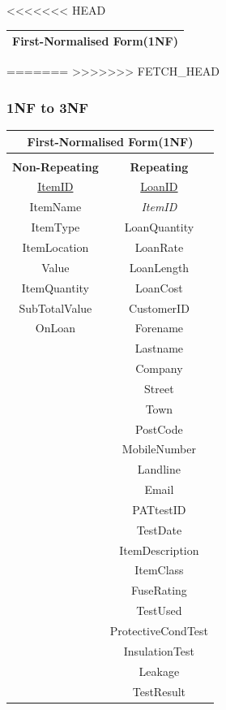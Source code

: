 \newpage

<<<<<<< HEAD
\begin{center}
    \begin{tabular}{|p{4cm}|}
        \hline
        \textbf{First-Normalised Form(1NF)}\\ \hline

    \end{tabular}
\end{center}


=======
>>>>>>> FETCH_HEAD
\subsubsection{1NF to 3NF}

\begin{center}
    \begin{tabular}{|c|c|}
        \hline
        \multicolumn{2}{|c|}{\textbf{First-Normalised Form(1NF)}}\\ \hline
        \multicolumn{2}{|c|}{ }\\ \hline
        \textbf{Non-Repeating} & \textbf{Repeating}\\ \hline
        \underline{ItemID }& \underline{LoanID }\\ \hline
        ItemName & \emph{ItemID} \\ \hline
        ItemType & LoanQuantity \\ \hline
        ItemLocation & LoanRate\\ \hline
        Value & LoanLength \\ \hline
        ItemQuantity & LoanCost \\ \hline
        SubTotalValue & CustomerID \\ \hline
        OnLoan &  Forename \\ \hline
         & Lastname \\ \hline
         & Company \\ \hline
         & Street \\ \hline
         & Town \\ \hline
         & PostCode \\ \hline
         & MobileNumber \\ \hline
         & Landline \\ \hline
         & Email \\ \hline
         & PATtestID \\ \hline
         & TestDate \\ \hline
         & ItemDescription \\ \hline
         & ItemClass \\ \hline
         & FuseRating \\ \hline
         & TestUsed \\ \hline
         & ProtectiveCondTest \\ \hline
         & InsulationTest \\ \hline
         & Leakage  \\ \hline
         & TestResult \\ \hline
    \end{tabular}
\end{center}

